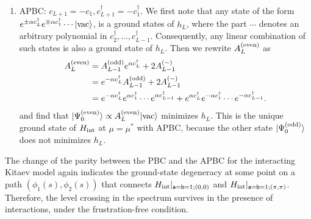 \documentclass[aps, prb, showpacs, twocolumn, %
amssymb,superscriptaddress]{revtex4}
\def\dag{\dagger}
\begin{document}
\begin{enumerate}
\item{APBC: $c_{L+1}=-c_1, c^\dagger_{L+1}=-c^\dagger_1$.} 
\newline
We first note that any state of the form $e^{\pm\alpha c^\dag_L}e^{\mp \alpha c^\dag_{1}} \cdots |\rm{vac}\rangle$, is a ground states of $h_L$, where the part $\cdots$ denotes an arbitrary polynomial in $c^\dag_2, ..., c^\dag_{L-1}$. Consequently, any linear combination of such states is also a ground state of $h_L$. Then we rewrite $A_L^{(\rm{even})}$ as
\begin{equation}
\begin{split}
A_L^{(\rm{even})} &= A_{L-1}^{(\rm{odd})}e^{\alpha c_L^\dagger}+2A_{L-1}^{(-)} \\
&= e^{-\alpha c_L^\dagger}A_{L-1}^{(\rm{odd})}+2A_{L-1}^{(-)} \\
&= e^{-\alpha c^\dag_L}e^{\alpha c^\dag_1} \cdots  e^{\alpha c^\dag_{L-1}}+e^{\alpha c^\dag_L}e^{-\alpha c^\dag_1} \cdots  e^{-\alpha c^\dag_{L-1}}.
\end{split}
\end{equation}
and find that $\lvert\Psi^{\rm{(even)}}_0\rangle\propto A_L^{\rm{(even)}}\lvert\mathrm{vac}\rangle$ minimizes $h_L$. This is the unique ground state of $H_{\rm int}$ at $\mu=\mu^*$ with APBC,  because the other state $\lvert\Psi^{\rm{(odd)}}_0\rangle$ does not minimizes $h_L$. 
\end{enumerate}

The change of the parity between the PBC and the APBC for the interacting Kitaev model again indicates the ground-state degeneracy at some point on a path $(\phi_1(s),\phi_2(s))$ that connects $H_{\rm{int}}|_{{\sf a}={\sf b}=1;(0,0)}$ and $H_{\rm{int}}|_{{\sf a}={\sf b}=1;(\pi,\pi)}$. Therefore, the level crossing in the spectrum survives in the presence of interactions, under the frustration-free condition. 



\end{document}
